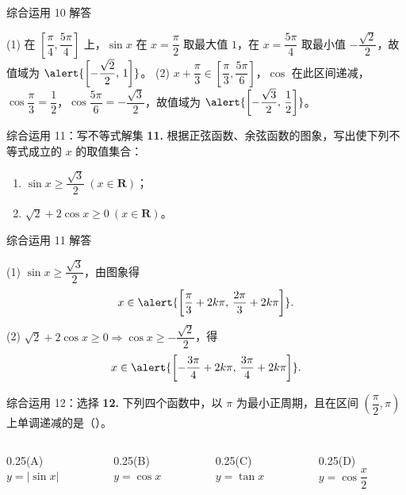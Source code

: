 \documentclass[10pt,aspectratio=169,serif]{beamer}
\begin{document}
\begin{frame}[t]{综合运用 10 解答}
\begin{tcolorbox}[colback=orange!10,colframe=orange,title=\textbf{解}]
(1) 在 $\left[\dfrac\pi4,\dfrac{5\pi}{4}\right]$ 上，$\sin x$ 在 $x=\dfrac\pi2$ 取最大值 $1$，在 $x=\dfrac{5\pi}{4}$ 取最小值 $-\dfrac{\sqrt2}{2}$，故值域为 $\alert{\left[-\dfrac{\sqrt2}{2},\,1\right]}$。
\vspace{0.3em}
(2) $x+\dfrac\pi3\in\left[\dfrac\pi3,\dfrac{5\pi}{6}\right]$，$\cos$ 在此区间递减，$\cos\dfrac\pi3=\dfrac12$，$\cos\dfrac{5\pi}{6}=-\dfrac{\sqrt3}{2}$，故值域为 $\alert{\left[-\dfrac{\sqrt3}{2},\,\dfrac12\right]}$。
\end{tcolorbox}
\end{frame}

\begin{frame}[t]{综合运用 11：写不等式解集}
\textbf{11.} 根据正弦函数、余弦函数的图象，写出使下列不等式成立的 $x$ 的取值集合：
\begin{enumerate}[(1)]
  \item $\sin x\ge\dfrac{\sqrt3}{2}\ (x\in\mathbf R)$； \qquad
  \item $\sqrt2+2\cos x\ge0\ (x\in\mathbf R)$。
\end{enumerate}
\end{frame}

\begin{frame}[t]{综合运用 11 解答}
\begin{tcolorbox}[colback=orange!10,colframe=orange,title=\textbf{解（$k\in\mathbf Z$）}]
(1) $\sin x\ge\dfrac{\sqrt3}{2}$，由图象得
\[
x\in\alert{\left[\frac{\pi}{3}+2k\pi,\,\frac{2\pi}{3}+2k\pi\right]}.
\]
(2) $\sqrt2+2\cos x\ge0\Rightarrow\cos x\ge-\dfrac{\sqrt2}{2}$，得
\[
x\in\alert{\left[-\frac{3\pi}{4}+2k\pi,\,\frac{3\pi}{4}+2k\pi\right]}.
\]
\end{tcolorbox}
\end{frame}

\begin{frame}[t]{综合运用 12：选择}
\textbf{12.} 下列四个函数中，以 $\pi$ 为最小正周期，且在区间 $\left(\dfrac{\pi}{2},\pi\right)$ 上单调递减的是（\quad ）。
\begin{columns}
\begin{column}{0.25\textwidth}{(A) $y=|\sin x|$}\end{column}
\begin{column}{0.25\textwidth}{(B) $y=\cos x$}\end{column}
\begin{column}{0.25\textwidth}{(C) $y=\tan x$}\end{column}
\begin{column}{0.25\textwidth}{(D) $y=\cos\dfrac{x}{2}$}\end{column}
\end{columns}
\end{frame}
\end{document}
